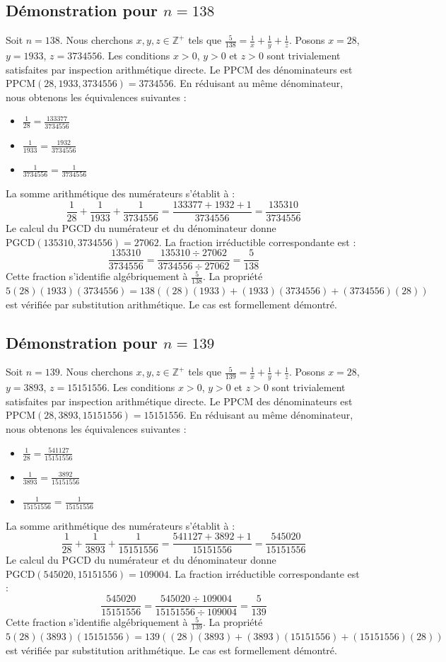 \documentclass[12pt,a4paper]{article}
\begin{document}
\subsection{Démonstration pour $n = 138$}
Soit $n = 138$. Nous cherchons $x, y, z \in \mathbb{Z}^{+}$ tels que $\frac{5}{138} = \frac{1}{x} + \frac{1}{y} + \frac{1}{z}$.
Posons $x = 28$, $y = 1933$, $z = 3734556$.
Les conditions $x > 0$, $y > 0$ et $z > 0$ sont trivialement satisfaites par inspection arithmétique directe.
Le PPCM des dénominateurs est $\text{PPCM}(28, 1933, 3734556) = 3734556$.
En réduisant au même dénominateur, nous obtenons les équivalences suivantes :
\begin{itemize}
    \item $\frac{1}{28} = \frac{133377}{3734556}$
    \item $\frac{1}{1933} = \frac{1932}{3734556}$
    \item $\frac{1}{3734556} = \frac{1}{3734556}$
\end{itemize}
La somme arithmétique des numérateurs s'établit à :
$$ \frac{1}{28} + \frac{1}{1933} + \frac{1}{3734556} = \frac{133377 + 1932 + 1}{3734556} = \frac{135310}{3734556} $$
Le calcul du PGCD du numérateur et du dénominateur donne $\text{PGCD}(135310, 3734556) = 27062$.
La fraction irréductible correspondante est :
$$ \frac{135310}{3734556} = \frac{135310 \div 27062}{3734556 \div 27062} = \frac{5}{138} $$
Cette fraction s'identifie algébriquement à $\frac{5}{138}$.
La propriété $5(28)(1933)(3734556) = 138((28)(1933) + (1933)(3734556) + (3734556)(28))$ est vérifiée par substitution arithmétique.
Le cas est formellement démontré.

\subsection{Démonstration pour $n = 139$}
Soit $n = 139$. Nous cherchons $x, y, z \in \mathbb{Z}^{+}$ tels que $\frac{5}{139} = \frac{1}{x} + \frac{1}{y} + \frac{1}{z}$.
Posons $x = 28$, $y = 3893$, $z = 15151556$.
Les conditions $x > 0$, $y > 0$ et $z > 0$ sont trivialement satisfaites par inspection arithmétique directe.
Le PPCM des dénominateurs est $\text{PPCM}(28, 3893, 15151556) = 15151556$.
En réduisant au même dénominateur, nous obtenons les équivalences suivantes :
\begin{itemize}
    \item $\frac{1}{28} = \frac{541127}{15151556}$
    \item $\frac{1}{3893} = \frac{3892}{15151556}$
    \item $\frac{1}{15151556} = \frac{1}{15151556}$
\end{itemize}
La somme arithmétique des numérateurs s'établit à :
$$ \frac{1}{28} + \frac{1}{3893} + \frac{1}{15151556} = \frac{541127 + 3892 + 1}{15151556} = \frac{545020}{15151556} $$
Le calcul du PGCD du numérateur et du dénominateur donne $\text{PGCD}(545020, 15151556) = 109004$.
La fraction irréductible correspondante est :
$$ \frac{545020}{15151556} = \frac{545020 \div 109004}{15151556 \div 109004} = \frac{5}{139} $$
Cette fraction s'identifie algébriquement à $\frac{5}{139}$.
La propriété $5(28)(3893)(15151556) = 139((28)(3893) + (3893)(15151556) + (15151556)(28))$ est vérifiée par substitution arithmétique.
Le cas est formellement démontré.
\end{document}
